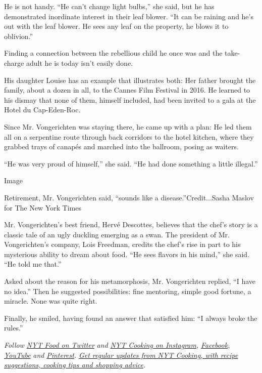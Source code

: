 He is not handy. ``He can't change light bulbs,'' she said, but he has
demonstrated inordinate interest in their leaf blower. ``It can be
raining and he's out with the leaf blower. He sees any leaf on the
property, he blows it to oblivion.''

Finding a connection between the rebellious child he once was and the
take-charge adult he is today isn't easily done.

His daughter Louise has an example that illustrates both: Her father
brought the family, about a dozen in all, to the Cannes Film Festival in
2016. He learned to his dismay that none of them, himself included, had
been invited to a gala at the Hotel du Cap-Eden-Roc.

Since Mr. Vongerichten was staying there, he came up with a plan: He led
them all on a serpentine route through back corridors to the hotel
kitchen, where they grabbed trays of canapés and marched into the
ballroom, posing as waiters.

``He was very proud of himself,'' she said. ``He had done something a
little illegal.''

Image

Retirement, Mr. Vongerichten said, ``sounds like a
disease.''Credit...Sasha Maslov for The New York Times

Mr. Vongerichten's best friend, Hervé Descottes, believes that the
chef's story is a classic tale of an ugly duckling emerging as a swan.
The president of Mr. Vongerichten's company, Lois Freedman, credits the
chef's rise in part to his mysterious ability to dream about food. ``He
sees flavors in his mind,'' she said. ``He told me that.''

Asked about the reason for his metamorphosis, Mr. Vongerichten replied,
``I have no idea.'' Then he suggested possibilities: fine mentoring,
simple good fortune, a miracle. None was quite right.

Finally, he smiled, having found an answer that satisfied him: ``I
always broke the rules.''

\emph{Follow} \href{https://twitter.com/nytfood}{\emph{NYT Food on
Twitter}} \emph{and}
\href{https://www.instagram.com/nytcooking/}{\emph{NYT Cooking on
Instagram}}\emph{,}
\href{https://www.facebook.com/nytcooking/}{\emph{Facebook}}\emph{,}
\href{https://www.youtube.com/nytcooking}{\emph{YouTube}} \emph{and}
\href{https://www.pinterest.com/nytcooking/}{\emph{Pinterest}}\emph{.}
\href{https://www.nytimes.com/newsletters/cooking}{\emph{Get regular
updates from NYT Cooking, with recipe suggestions, cooking tips and
shopping advice}}\emph{.}

